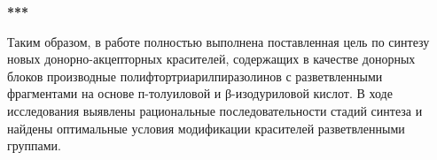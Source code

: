 \begin{center}
    \LARGE
    \textbf{***}
\end{center}

Таким образом, в работе полностью выполнена поставленная цель по синтезу новых донорно-акцепторных красителей, содержащих в качестве донорных блоков производные полифтортриарилпиразолинов с разветвленными фрагментами на основе п-толуиловой и β-изодуриловой кислот.
В ходе исследования выявлены рациональные последовательности стадий синтеза и найдены оптимальные условия модификации красителей разветвленными группами.